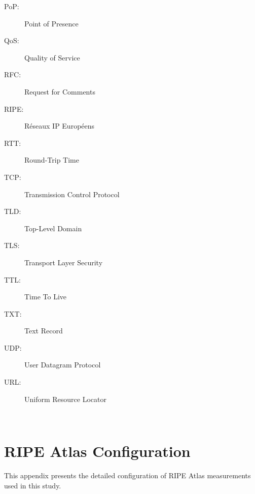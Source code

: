 \documentclass[a4paper,11pt]{book}
\begin{document}
\begin{description}
    \item[PoP:] Point of Presence
    \item[QoS:] Quality of Service
    \item[RFC:] Request for Comments
    \item[RIPE:] Réseaux IP Européens
    \item[RTT:] Round-Trip Time
    \item[TCP:] Transmission Control Protocol
    \item[TLD:] Top-Level Domain
    \item[TLS:] Transport Layer Security
    \item[TTL:] Time To Live
    \item[TXT:] Text Record
    \item[UDP:] User Datagram Protocol
    \item[URL:] Uniform Resource Locator
\end{description}

\clearpage\newpage\hbox{ }\clearpage\newpage

\fancyhf{}
\fancyfoot[L]{\nouppercase{\leftmark}}
\fancyfoot[R]{\thepage}
\renewcommand{\headrulewidth}{0pt}
\renewcommand{\footrulewidth}{0.4pt}
\pagestyle{fancy}









\printbibliography[heading=bibintoc,title={Bibliography}]


\appendix

\chapter{RIPE Atlas Configuration}

This appendix presents the detailed configuration of RIPE Atlas measurements used in this study.
\end{document}
